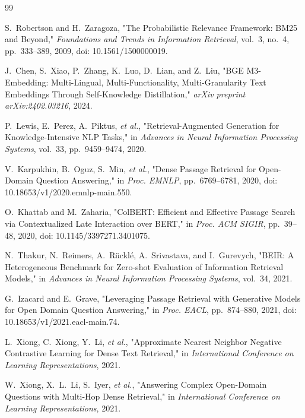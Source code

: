 \begin{thebibliography}{99}


S.~Robertson and H.~Zaragoza,
"The Probabilistic Relevance Framework: BM25 and Beyond,"
\emph{Foundations and Trends in Information Retrieval},
vol.~3, no.~4, pp.~333--389, 2009,
doi: 10.1561/1500000019.

J.~Chen, S.~Xiao, P.~Zhang, K.~Luo, D.~Lian, and Z.~Liu,
"BGE M3-Embedding: Multi-Lingual, Multi-Functionality, Multi-Granularity Text Embeddings Through Self-Knowledge Distillation,"
\emph{arXiv preprint arXiv:2402.03216}, 2024.

P.~Lewis, E.~Perez, A.~Piktus, \emph{et al.},
"Retrieval-Augmented Generation for Knowledge-Intensive NLP Tasks,"
in \emph{Advances in Neural Information Processing Systems}, vol.~33, pp.~9459--9474, 2020.

V.~Karpukhin, B.~Oguz, S.~Min, \emph{et al.},
"Dense Passage Retrieval for Open-Domain Question Answering,"
in \emph{Proc. EMNLP}, pp.~6769--6781, 2020,
doi: 10.18653/v1/2020.emnlp-main.550.

O.~Khattab and M.~Zaharia,
"ColBERT: Efficient and Effective Passage Search via Contextualized Late Interaction over BERT,"
in \emph{Proc. ACM SIGIR}, pp.~39--48, 2020,
doi: 10.1145/3397271.3401075.

N.~Thakur, N.~Reimers, A.~R\"uckl\'e, A.~Srivastava, and I.~Gurevych,
"BEIR: A Heterogeneous Benchmark for Zero-shot Evaluation of Information Retrieval Models,"
in \emph{Advances in Neural Information Processing Systems}, vol.~34, 2021.

G.~Izacard and E.~Grave,
"Leveraging Passage Retrieval with Generative Models for Open Domain Question Answering,"
in \emph{Proc. EACL}, pp.~874--880, 2021,
doi: 10.18653/v1/2021.eacl-main.74.

L.~Xiong, C.~Xiong, Y.~Li, \emph{et al.},
"Approximate Nearest Neighbor Negative Contrastive Learning for Dense Text Retrieval,"
in \emph{International Conference on Learning Representations}, 2021.

W.~Xiong, X.~L.~Li, S.~Iyer, \emph{et al.},
"Answering Complex Open-Domain Questions with Multi-Hop Dense Retrieval,"
in \emph{International Conference on Learning Representations}, 2021.


\end{thebibliography}
